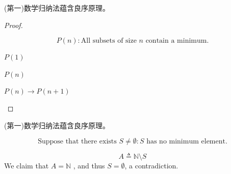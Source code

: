 \begin{frame}{}
  \begin{lemma}
    (第一)数学归纳法蕴含良序原理。
  \end{lemma}

  \pause
  \begin{proof}
    \begin{center}

      \vspace{-0.30cm}
      \[
        P(n): \text{All subsets of size $n$ contain a minimum.}
      \]

      \pause
      \begin{description}
        \item[Basis Step:] $P(1)$
        \item[\textcolor{cyan}{Inductive Hypothesis:}] $P(n)$
        \item[Inductive Step:] $P(n) \to P(n+1)$
      \end{description}

    \end{center}
  \end{proof}
\end{frame}

\begin{frame}{}
  \begin{lemma}
    (第一)数学归纳法蕴含良序原理。
  \end{lemma}

  \begin{center}
    \[
      \text{Suppose that there exists } S \neq \emptyset: S \text{ has no minimum element.}
    \]

    \pause
    \[
      A \triangleq \mathbb{N} \setminus S
    \]
    \pause
    We claim that $A = \mathbb{N}$ , and thus $S = \emptyset$, a contradiction.
  \end{center}
\end{frame}
